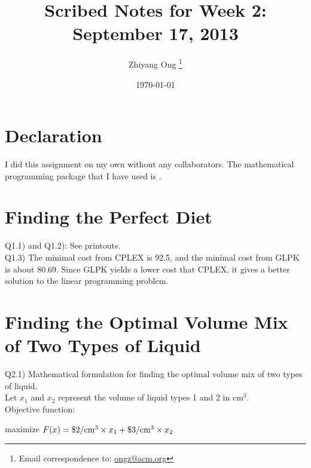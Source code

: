 \documentclass[letter,12pt]{article}
\begin{document}
\title{Scribed Notes for Week 2: September 17, 2013}
\date{\today}
\author{Zhiyang Ong
	\thanks{Email correspondence to: \href{mailto:ongz@acm.org}{ongz@acm.org}}
}
\maketitle






\section{Declaration}
\label{sec:declaration}

I did this assignment on my own without any collaborators. The mathematical programming package that I have used is \cite{Makhorin2012}. 







\section{Finding the Perfect Diet}
\label{sec:findingperfectdiet}

Q1.1) and Q1.2): See printouts. \\

Q1.3) The minimal cost from CPLEX is 92.5, and the minimal cost from GLPK is about 80.69. Since GLPK yields a lower cost that CPLEX, it gives a better solution to the linear programming problem.


\section{Finding the Optimal Volume Mix of Two Types of Liquid}
\label{sec:optimalliquidmix}

Q2.1) Mathematical formulation for finding the optimal volume mix of two types of liquid. \\

Let $x_{1}$ and $x_{2}$ represent the volume of liquid types 1 and 2 in cm$^{3}$. \\

Objective function:

maximize $F(x) = \$2/{\rm cm}^{3} \times x_{1} + \$3/{\rm cm}^{3} \times x_{2} $ \\
\end{document}
